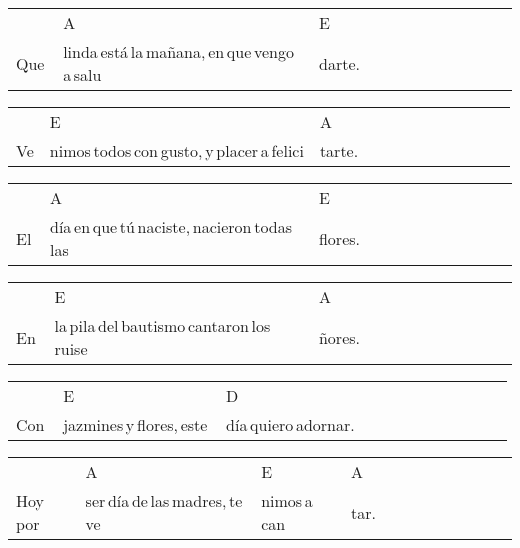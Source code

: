 \begin{multicols}{2}
\noindent
\begin{minipage}{\columnwidth}
\noindent
\noindent
\begin{tabular}{llllllllllll}
&A&E\\
Que\,&linda\,está\,la\,mañana,\,en\,que\,vengo\,a\,salu&darte.
\end{tabular}

\noindent
\begin{tabular}{llllllllllll}
&E&A\\
Ve&nimos\,todos\,con\,gusto,\,y\,placer\,a\,felici&tarte.
\end{tabular}

\noindent
\begin{tabular}{llllllllllll}
&A&E\\
El\,&día\,en\,que\,tú\,naciste,\,nacieron\,todas\,las\,&flores.
\end{tabular}

\noindent
\begin{tabular}{llllllllllll}
&E&A\\
En\,&la\,pila\,del\,bautismo\,cantaron\,los\,ruise&ñores.
\end{tabular}

\noindent
\begin{tabular}{llllllllllll}
&E&D\\
Con\,&jazmines\,y\,flores,\,este\,&día\,quiero\,adornar.
\end{tabular}

\noindent
\begin{tabular}{llllllllllll}
&A&E&A\\
Hoy\,por\,&ser\,día\,de\,las\,madres,\,te\,ve&nimos\,a\,can&tar.
\end{tabular}
\end{minipage}\\

\end{multicols}
